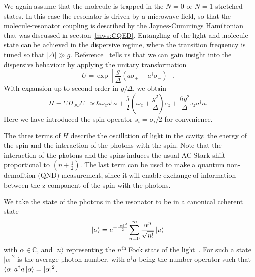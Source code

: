 We again assume that the molecule is trapped in the $N=0$ or $N=1$ stretched
states. In this case the resonator is driven by a microwave field, so that the
molecule-resonator coupling is described by the Jaynes-Cummings
Hamiltonian that was discussed in section~\ref{mws:CQED}.
%
Entangling of the light and molecule state can be achieved in the dispersive
regime, where the transition frequency is tuned so that $|\Delta|\gg g$.
Reference~\cite{PhysRevA.69.062320} tells us that we can gain insight into the
dispersive behaviour by applying the unitary transformation
%
\begin{equation}
  U = \exp \left[\frac{g}{\Delta}(a\sigma_+ - a^\dagger\sigma_-)\right].
  \label{mws:eqn:Utransform}
\end{equation}
%
With expansion up to second order in $g/\Delta$, we obtain
%
\begin{equation} H= UH_\text{JC}U^\dagger \approx \hbar \omega_c
  a^\dagger a + \frac{\hbar}{2}\left(\omega_c +
  \frac{g^2}{\Delta}\right)s_z + \frac{\hbar
  g^2}{\Delta}s_z a^\dagger a.
  \label{mws:eqn:UHU}
\end{equation}
%
Here we have introduced the spin operator $s_i = \sigma_i/2$ for convenience.

The three terms of $H$ describe the oscillation of light in the cavity, the
energy of the spin and the interaction of the photons with the spin. Note that
the interaction of the photons and the spins induces the usual AC Stark shift
proportional to $(n+\frac{1}{2})$. The last term can be used to make a quantum
non-demolition (QND) measurement, since it will enable exchange of information
between the z-component of the spin with the photons.

We take the state of the photons in the resonator to be in a canonical coherent
state~\cite{Gazeau2009}
%
\begin{equation}
  \ket{\alpha} = e^{-\frac{|\alpha|^2}{2}}\sum_{n=0}^\infty \frac{\alpha^n}{\sqrt{n!}} \ket{n}
  \label{mws:eqn:coherent}
\end{equation}
%
with $\alpha\in\mathbb{C}$, and $\ket{n}$ representing the $n^\text{th}$
Fock state of the light~\cite{agarwal2012}. For such a state $|\alpha|^2$ is
the average photon number, with $a^\dagger a$ being the number operator such
that $\bra{\alpha}a^\dagger a \ket{\alpha} = |\alpha|^2$.

